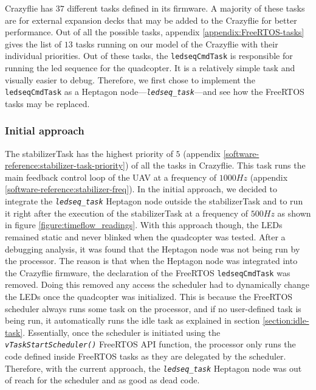 \documentclass[10pt, a4paper]{article}
\newcommand{\textFunc}[1]{\texttt{\textit{#1}}}
\newcommand{\code}[1]{\texttt{#1}}
\begin{document}
    Crazyflie has $37$ different tasks defined in its firmware. A majority of these tasks are for external expansion decks \cite{web:expansion-decks} that may be added to the Crazyflie for better performance. Out of all the possible tasks, appendix \ref{appendix:FreeRTOS-tasks} gives the list of $13$ tasks running on our model of the Crazyflie with their individual priorities. Out of these tasks, the \code{ledseqCmdTask} is responsible for running the led sequence for the quadcopter. It is a relatively simple task and visually easier to debug. Therefore, we first chose to implement the \code{ledseqCmdTask} as a Heptagon node---\textFunc{ledseq\_task}---and see how the FreeRTOS tasks may be replaced.

    \subsubsection{Initial approach}
    The stabilizerTask has the highest priority of $5$ (appendix \ref{software-reference:stabilizer-task-priority}) of all the tasks in Crazyflie. This task runs the main feedback control loop of the UAV at a frequency of $1000Hz$ (appendix \ref{software-reference:stabilizer-freq}). In the initial approach, we decided to integrate the \textFunc{ledseq\_task} Heptagon node outside the stabilizerTask and to run it right after the execution of the stabilizerTask at a frequency of $500Hz$ as shown in figure \ref{figure:timeflow_readings}. With this approach though, the LEDs remained static and never blinked when the quadcopter was tested. After a debugging analysis, it was found that the Heptagon node was not being run by the processor. The reason is that when the Heptagon node was integrated into the Crazyflie firmware, the declaration of the FreeRTOS \code{ledseqCmdTask} was removed. Doing this removed any access the scheduler had to dynamically change the LEDs once the quadcopter was initialized. This is because the FreeRTOS scheduler always runs some task on the processor, and if no user-defined task is being run, it automatically runs the idle task as explained in section \ref{section:idle-task}. Essentially, once the scheduler is initiated using the \textFunc{vTaskStartScheduler()} FreeRTOS API function, the processor only runs the code defined inside FreeRTOS tasks as they are delegated by the scheduler. Therefore, with the current approach, the \textFunc{ledseq\_task} Heptagon node was out of reach for the scheduler and as good as dead code.
\end{document}
